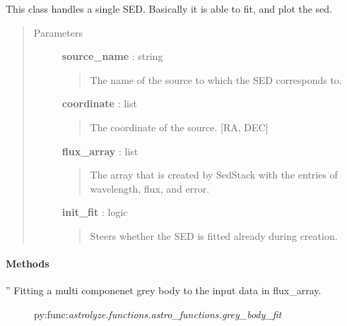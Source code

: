 \documentclass[a4paper,10pt,english]{sphinxmanual}
\begin{document}
\begin{fulllineitems}
\label{sed:astrolyze.sed.sed.Sed}
This class handles a single SED. Basically it is able to fit,
and plot the sed.
\begin{quote}\begin{description}
\item[{Parameters }] \leavevmode
\textbf{source\_name} : string
\begin{quote}

The name of the source to which the SED corresponds to.
\end{quote}

\textbf{coordinate} : list
\begin{quote}

The coordinate of the source. {[}RA, DEC{]}
\end{quote}

\textbf{flux\_array} : list
\begin{quote}

The array that is created by SedStack with the entries of wavelength,
flux, and error.
\end{quote}

\textbf{init\_fit} : logic
\begin{quote}

Steers whether the SED is fitted already during creation.
\end{quote}

\end{description}\end{quote}
\paragraph{Methods}

\begin{fulllineitems}
\label{sed:astrolyze.sed.sed.Sed.grey_body_fit}
''
Fitting a multi componenet grey body to the input data in flux\_array.



\begin{description}
\item[{\code{}}] \leavevmode
py:func:\emph{astrolyze.functions.astro\_functions.grey\_body\_fit}


\end{description}
\end{fulllineitems}
\end{fulllineitems}
\end{document}
